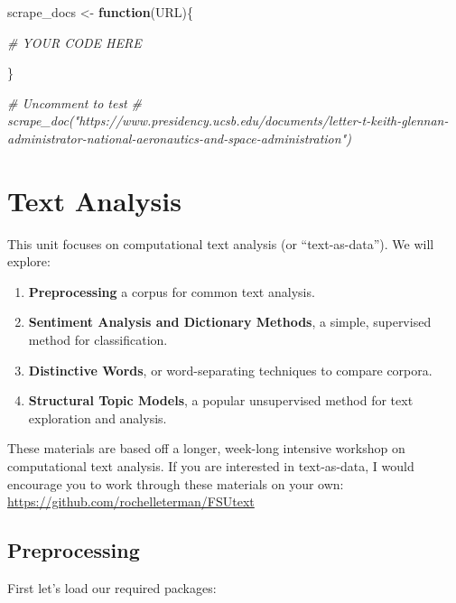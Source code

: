 \documentclass[]{book}
\newenvironment{Shaded}{\begin{snugshade}}{\end{snugshade}}
\newcommand{\KeywordTok}[1]{\textcolor[rgb]{0.13,0.29,0.53}{\textbf{#1}}}
\newcommand{\StringTok}[1]{\textcolor[rgb]{0.31,0.60,0.02}{#1}}
\newcommand{\CommentTok}[1]{\textcolor[rgb]{0.56,0.35,0.01}{\textit{#1}}}
\newcommand{\ControlFlowTok}[1]{\textcolor[rgb]{0.13,0.29,0.53}{\textbf{#1}}}
\newcommand{\NormalTok}[1]{#1}
\providecommand{\tightlist}{%
  \setlength{\itemsep}{0pt}\setlength{\parskip}{0pt}}
\begin{document}
\begin{Shaded}
\begin{Highlighting}[]
\NormalTok{scrape_docs <-}\StringTok{ }\ControlFlowTok{function}\NormalTok{(URL)\{}

  \CommentTok{# YOUR CODE HERE}
  
\NormalTok{\}}

\CommentTok{# Uncomment to test}
\CommentTok{# scrape_doc("https://www.presidency.ucsb.edu/documents/letter-t-keith-glennan-administrator-national-aeronautics-and-space-administration")}
\end{Highlighting}
\end{Shaded}

\chapter{Text Analysis}\label{text-analysis}

This unit focuses on computational text analysis (or ``text-as-data'').
We will explore:

\begin{enumerate}
\def\labelenumi{\arabic{enumi}.}
\tightlist
\item
  \textbf{Preprocessing} a corpus for common text analysis.
\item
  \textbf{Sentiment Analysis and Dictionary Methods}, a simple,
  supervised method for classification.
\item
  \textbf{Distinctive Words}, or word-separating techniques to compare
  corpora.
\item
  \textbf{Structural Topic Models}, a popular unsupervised method for
  text exploration and analysis.
\end{enumerate}

These materials are based off a longer, week-long intensive workshop on
computational text analysis. If you are interested in text-as-data, I
would encourage you to work through these materials on your own:
\url{https://github.com/rochelleterman/FSUtext}

\section{Preprocessing}\label{preprocessing}

First let's load our required packages:

\begin{Shaded}
\end{Shaded}
\end{document}
